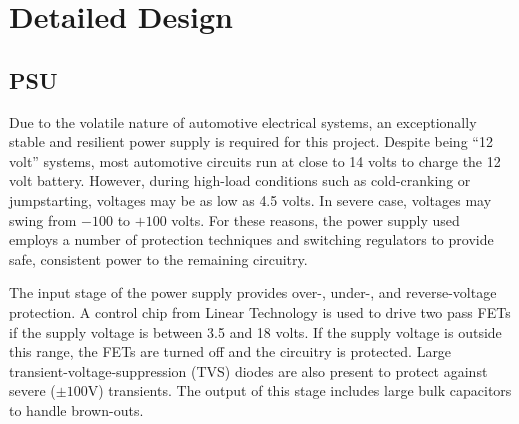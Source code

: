 \chapter{Detailed Design}
\label{chap:detailed-design}




\section{PSU}
Due to the volatile nature of automotive electrical systems, an exceptionally stable and 
resilient power supply is required for this project.  Despite being ``12 volt''
systems, most automotive circuits run at close to 14 volts to charge the 12
volt battery.  However, during high-load conditions such as cold-cranking or
jumpstarting, voltages may be as low as 4.5 volts.  In severe case, voltages
may swing from $-100$ to $+100$ volts.  For these reasons, the power supply used
employs a number of protection techniques and switching regulators to provide
safe, consistent power to the remaining circuitry.

The input stage of the power supply provides over-, under-, and reverse-voltage
protection.  A control chip from Linear Technology \cite{ltc4365ds} is used to drive two pass
FETs if the supply voltage is between 3.5 and 18 volts.  If the supply voltage
is outside this range, the FETs are turned off and the circuitry is
protected.  Large transient-voltage-suppression (TVS) diodes are also present to
protect against severe ($\pm 100$V) transients.  The output of this stage includes
large bulk capacitors to handle brown-outs.


